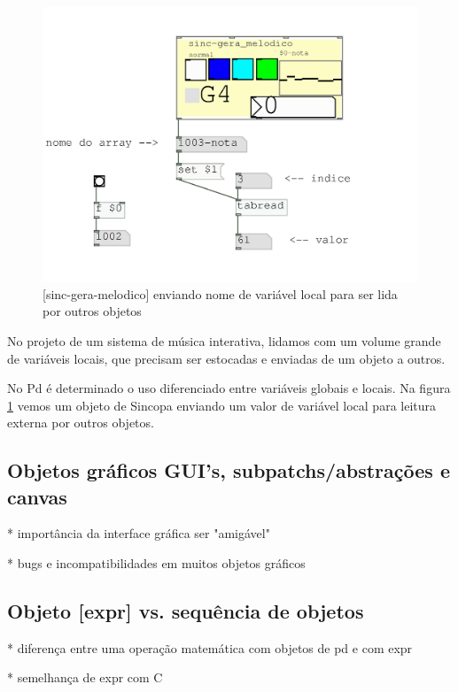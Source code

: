 \documentclass[draft]{ppgmus}
\begin{document}
\begin{figure}
\includegraphics[scale=.6]{ex-variaveis}
\caption{[sinc-gera-melodico] enviando nome de variável local para ser lida por outros objetos}
\label{ex-variaveis}
\end{figure}

No projeto de um sistema de música interativa, lidamos com um volume grande
de variáveis locais, que precisam ser estocadas e enviadas de um objeto a outros.

No Pd é determinado o uso diferenciado entre variáveis globais e locais.
Na figura \ref{ex-variaveis} vemos um objeto de Sincopa enviando um valor de 
variável local para leitura externa por outros objetos.




\subsection{Objetos gráficos GUI's, subpatchs/abstrações e canvas}


* importância da interface gráfica ser "amigável"

* bugs e incompatibilidades em muitos objetos gráficos



\subsection{Objeto [expr] vs. sequência de objetos}

* diferença entre uma operação matemática com objetos de pd e com expr

* semelhança de expr com C
\end{document}
